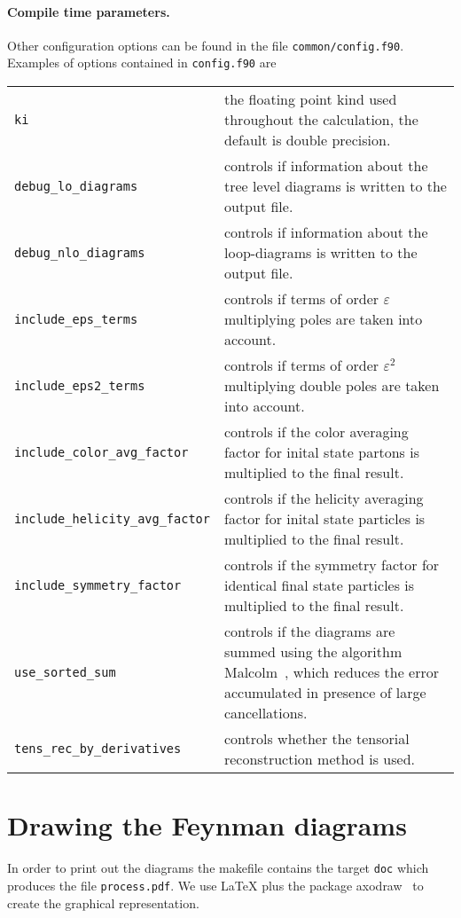 \documentclass[11pt,a4paper]{refrep}
\begin{document}
\paragraph{Compile time parameters.}
Other configuration options can be found in the file \texttt{common/config.f90}.
\smallskip
Examples of options contained in \texttt{config.f90} are
\begin{maxipage}
\begin{tabular}{lp{}}
\texttt{ki} & the floating point kind used throughout the calculation, the default is double precision.\\
\texttt{debug\_lo\_diagrams} & controls if information about the
    tree level diagrams is written to the output file.\\
\texttt{debug\_nlo\_diagrams} & controls if information about the
    loop-diagrams is written to the output file.\\
\texttt{include\_eps\_terms} & controls if
    terms of order $\varepsilon$ multiplying
    poles are taken into account.\\
\texttt{include\_eps2\_terms} & controls if
    terms of order $\varepsilon^2$ multiplying
    double poles are taken into account.\\
\texttt{include\_color\_avg\_factor} & controls if the color averaging
    factor for inital state partons is multiplied to the final result.\\
\texttt{include\_helicity\_avg\_factor} & controls if the helicity averaging
    factor for inital state particles is multiplied to the final result.\\
\texttt{include\_symmetry\_factor} & controls if the symmetry
    factor for identical final state particles
    is multiplied to the final result. \\
\texttt{use\_sorted\_sum} & controls if the diagrams are summed using
    the algorithm Malcolm~\cite{Malcolm:1970}, which reduces the error
    accumulated in presence of large cancellations.\\
\texttt{tens\_rec\_by\_derivatives} & controls whether the tensorial reconstruction method is used.
\end{tabular}
\end{maxipage}

\section{Drawing the Feynman diagrams}
In order to print out the diagrams the makefile contains the target
\texttt{doc} which produces the file \texttt{process.pdf}.
We use \LaTeX{} plus the package \textsf{axodraw}~\cite{Vermaseren:1994je}
to create the graphical representation.
\end{document}

